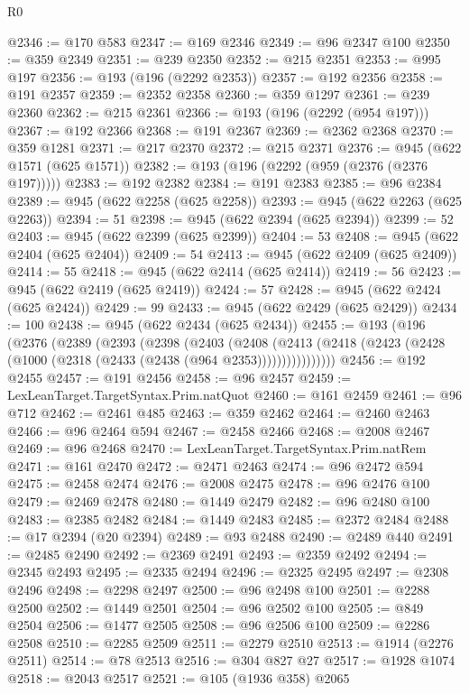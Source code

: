 \begin{lexlean}{R0}
\begin{coremodule}
@2346 := @170 @583
@2347 := @169 @2346
@2349 := @96 @2347 @100
@2350 := @359 @2349
@2351 := @239 @2350
@2352 := @215 @2351
@2353 := @995 @197
@2356 := @193 (@196 (@2292 @2353))
@2357 := @192 @2356
@2358 := @191 @2357
@2359 := @2352 @2358
@2360 := @359 @1297
@2361 := @239 @2360
@2362 := @215 @2361
@2366 := @193 (@196 (@2292 (@954 @197)))
@2367 := @192 @2366
@2368 := @191 @2367
@2369 := @2362 @2368
@2370 := @359 @1281
@2371 := @217 @2370
@2372 := @215 @2371
@2376 := @945 (@622 @1571 (@625 @1571))
@2382 := @193 (@196 (@2292 (@959 (@2376 (@2376 @197)))))
@2383 := @192 @2382
@2384 := @191 @2383
@2385 := @96 @2384
@2389 := @945 (@622 @2258 (@625 @2258))
@2393 := @945 (@622 @2263 (@625 @2263))
@2394 := 51
@2398 := @945 (@622 @2394 (@625 @2394))
@2399 := 52
@2403 := @945 (@622 @2399 (@625 @2399))
@2404 := 53
@2408 := @945 (@622 @2404 (@625 @2404))
@2409 := 54
@2413 := @945 (@622 @2409 (@625 @2409))
@2414 := 55
@2418 := @945 (@622 @2414 (@625 @2414))
@2419 := 56
@2423 := @945 (@622 @2419 (@625 @2419))
@2424 := 57
@2428 := @945 (@622 @2424 (@625 @2424))
@2429 := 99
@2433 := @945 (@622 @2429 (@625 @2429))
@2434 := 100
@2438 := @945 (@622 @2434 (@625 @2434))
@2455 := @193
    (@196
      (@2376
        (@2389
          (@2393
            (@2398
              (@2403
                (@2408
                  (@2413
                    (@2418 (@2423 (@2428 (@1000 (@2318 (@2433 (@2438 (@964 @2353))))))))))))))))
@2456 := @192 @2455
@2457 := @191 @2456
@2458 := @96 @2457
@2459 := LexLeanTarget.TargetSyntax.Prim.natQuot
@2460 := @161 @2459
@2461 := @96 @712
@2462 := @2461 @485
@2463 := @359 @2462
@2464 := @2460 @2463
@2466 := @96 @2464 @594
@2467 := @2458 @2466
@2468 := @2008 @2467
@2469 := @96 @2468
@2470 := LexLeanTarget.TargetSyntax.Prim.natRem
@2471 := @161 @2470
@2472 := @2471 @2463
@2474 := @96 @2472 @594
@2475 := @2458 @2474
@2476 := @2008 @2475
@2478 := @96 @2476 @100
@2479 := @2469 @2478
@2480 := @1449 @2479
@2482 := @96 @2480 @100
@2483 := @2385 @2482
@2484 := @1449 @2483
@2485 := @2372 @2484
@2488 := @17 @2394 (@20 @2394)
@2489 := @93 @2488
@2490 := @2489 @440
@2491 := @2485 @2490
@2492 := @2369 @2491
@2493 := @2359 @2492
@2494 := @2345 @2493
@2495 := @2335 @2494
@2496 := @2325 @2495
@2497 := @2308 @2496
@2498 := @2298 @2497
@2500 := @96 @2498 @100
@2501 := @2288 @2500
@2502 := @1449 @2501
@2504 := @96 @2502 @100
@2505 := @849 @2504
@2506 := @1477 @2505
@2508 := @96 @2506 @100
@2509 := @2286 @2508
@2510 := @2285 @2509
@2511 := @2279 @2510
@2513 := @1914 (@2276 @2511)
@2514 := @78 @2513
@2516 := @304 @827 @27
@2517 := @1928 @1074
@2518 := @2043 @2517
@2521 := @105 (@1936 @358) @2065

\end{coremodule}
\end{lexlean}
